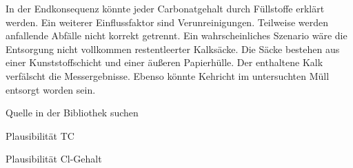 In der Endkonsequenz könnte jeder Carbonatgehalt durch Füllstoffe erklärt werden. Ein weiterer Einflussfaktor sind Verunreinigungen. Teilweise werden anfallende Abfälle nicht korrekt getrennt. Ein wahrscheinliches Szenario wäre die Entsorgung nicht vollkommen restentleerter Kalksäcke. Die Säcke bestehen aus einer Kunststoffschicht und einer äußeren Papierhülle. Der enthaltene Kalk verfälscht die Messergebnisse. Ebenso könnte Kehricht im untersuchten Müll entsorgt worden sein.


Quelle in der Bibliothek suchen

Plausibilität TC

Plausibilität Cl-Gehalt\\

%

